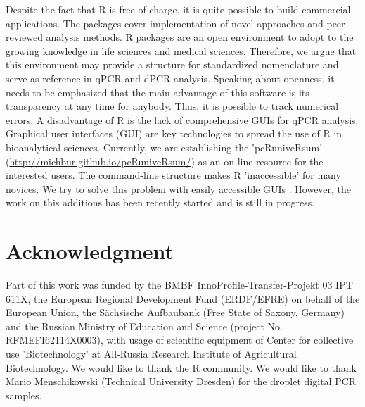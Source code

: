 Despite the fact 
that R is free of charge, it is quite possible to build commercial applications. 
The packages cover implementation of novel approaches and peer-reviewed analysis 
methods. R packages are an open environment to adopt to the growing knowledge in 
life sciences and medical sciences. Therefore, we argue that this environment may provide a 
structure for standardized nomenclature and serve as reference in qPCR and dPCR 
analysis. Speaking about openness, it needs to be emphasized that the main 
advantage of this software is its transparency at any time for anybody. Thus, it 
is possible to track numerical errors.  A disadvantage of R is the lack of 
comprehensive GUIs for qPCR analysis. Graphical user interfaces 
(GUI) are key technologies to spread the use of R in bioanalytical sciences. 
Currently, we are establishing the 'pcRuniveRsum' 
(\url{http://michbur.github.io/pcRuniveRsum/}) as an on-line resource for the 
interested users. The command-line structure makes R 'inaccessible' for many 
novices. We try to solve this problem with easily accessible GUIs 
\citep{rodiger_rkward_2012}. However, the work on this additions has been 
recently started and is still in progress.

\section{Acknowledgment}

Part of this work was funded by the BMBF InnoProfile-Transfer-Projekt 03 IPT 
611X, the European Regional Development Fund (ERDF/EFRE) on behalf of the 
European Union, the S\"{a}chsische Aufbaubank (Free State of Saxony, 
Germany) and the Russian Ministry of Education and Science (project No. 
RFMEFI62114X0003), with usage of scientific equipment of Center for 
collective use 'Biotechnology' at All-Russia Research Institute of 
Agricultural Biotechnology. We would like to thank the R community. We would 
like to thank Mario Menschikowski (Technical University Dresden) for the droplet 
digital PCR samples. 



\address{Stefan R\"odiger (corresponding author)\\
  Faculty of Natural Sciences\\
  Brandenburg University of Technology Cottbus--Senftenberg\\
  Senftenberg\\
  Germany}


